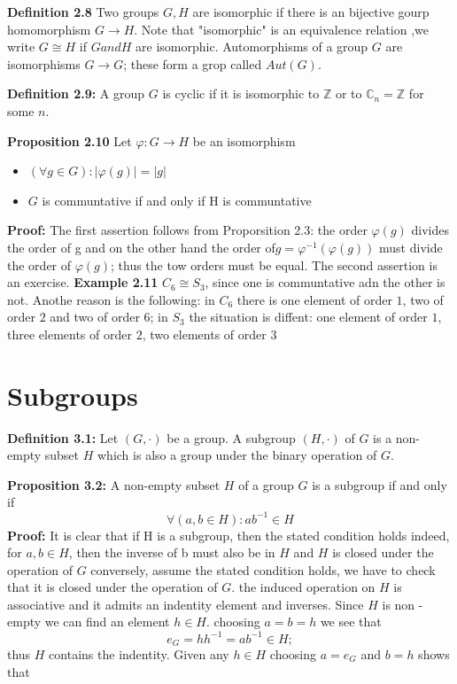 \textbf{Definition 2.8} Two groups $G,H$ are isomorphic if there is an bijective gourp homomorphism $G \to H$.
Note that "isomorphic" is an equivalence relation ,we write $G \cong H$ if $G and H$ are isomorphic.
Automorphisms of a group $G$ are isomorphisms $G \to G$; these form a grop called $Aut(G)$.

\textbf{Definition 2.9:} A group $G$ is cyclic if it is isomorphic to $\mathbb{Z}$ or to $\mathbb{C}_n =\mathbb{Z}$ for some $n$.

\textbf{Proposition 2.10} Let $\varphi : G \to H $ be an isomorphism
\begin{itemize}
    \item $(\forall g \in G): |\varphi(g)| = |g|$
    \item $G$ is communtative if and only if H is communtative
\end{itemize}

\textbf{Proof: }The first assertion follows from Proporsition 2.3: the order $\varphi(g)$ divides the order of g and on the other hand the order of$g = \varphi^{-1}(\varphi(g))$ must divide the order of $\varphi(g)$; thus the tow orders must be equal.
The second assertion is an exercise.
\textbf{Example 2.11} $C_6 \cong S_3$, since one is communtative adn the other is not. Anothe reason is the following: in $C_6$ there is one element of order $1$, two of order $2$ and two of order $6$; in $S_3$ the situation is diffent: one element of order $1$, three elements of order $2$, two elements of order $3$

\section*{Subgroups}

\textbf{Definition 3.1:} Let $(G, \cdot)$ be a group. A subgroup $(H, \cdot)$ of $G$ is a non-empty subset $H$ which is also a group under the binary operation of $G$.

\textbf{Proposition 3.2:} A non-empty subset $H$ of a group $G$ is a subgroup if and only if
$$ \forall (a, b \in H) : ab^{-1} \in H $$
\textbf{Proof:} It is clear that if H is a subgroup, then the stated condition holds indeed, for $ a,b \in H$, then the inverse of b must also be in $H$ and $H$ is closed under the operation of $G$
conversely, assume the stated condition holds, we have to check that it is closed under the operation of $G$. the induced operation on $H$ is associative and it admits an indentity element and inverses. Since $H$ is non - empty we can find an element $h \in H$. choosing $a=b=h$ we see that $$e_G = hh^{-1}=ab^{-1} \in H;$$ thus $H$ contains the indentity. Given any $h \in H$ choosing $a=e_G$ and $b=h$ shows that

